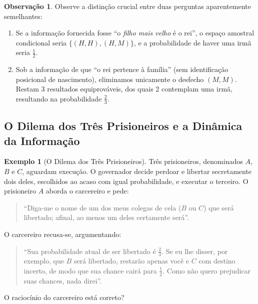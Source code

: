 \documentclass[12pt,portuguese]{article}
\theoremstyle{definition}
\newtheorem{example}[example]{Exemplo}
\newtheorem{remark}[remark]{Observação}
\begin{document}
\begin{remark}
Observe a distinção crucial entre duas perguntas aparentemente semelhantes:
\begin{enumerate}[label=(\alph*)]
  \item Se a informação fornecida fosse ``o \emph{filho mais velho} é o rei'', o espaço amostral condicional seria \(\{(H,H), (H,M)\}\), e a probabilidade de haver uma irmã seria \(\tfrac{1}{2}\).
  \item Sob a informação de que ``o rei pertence à família'' (sem identificação posicional de nascimento), eliminamos unicamente o desfecho \((M,M)\). Restam 3 resultados equiprováveis, dos quais 2 contemplam uma irmã, resultando na probabilidade \(\tfrac{2}{3}\).
\end{enumerate}
\end{remark}

\subsection{O Dilema dos Três Prisioneiros e a Dinâmica da Informação}

\begin{example}[O Dilema dos Três Prisioneiros]\label{ex:prisioneiro}
Três prisioneiros, denominados \(A\), \(B\) e \(C\), aguardam execução. O governador decide perdoar e libertar secretamente dois deles, escolhidos ao acaso com igual probabilidade, e executar o terceiro. O prisioneiro \(A\) aborda o carcereiro e pede: 
\begin{quote}
``Diga-me o nome de um dos meus colegas de cela (\(B\) ou \(C\)) que será libertado; afinal, ao menos um deles certamente será''.
\end{quote} 
O carcereiro recusa-se, argumentando: 
\begin{quote}
``Sua probabilidade atual de ser libertado é \(\tfrac{2}{3}\). Se eu lhe disser, por exemplo, que \(B\) será libertado, restarão apenas você e \(C\) com destino incerto, de modo que sua chance cairá para \(\tfrac{1}{2}\). Como não quero prejudicar suas chances, nada direi''. 
\end{quote}
O raciocínio do carcereiro está correto?
\end{example}
\end{document}
